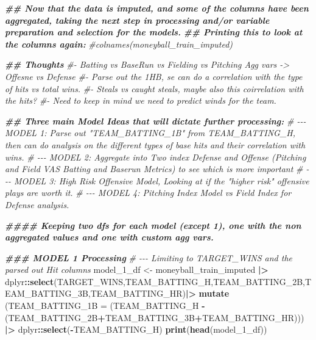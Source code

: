 \documentclass[
]{article}
\newenvironment{Shaded}{\begin{snugshade}}{\end{snugshade}}
\newcommand{\AttributeTok}[1]{\textcolor[rgb]{0.13,0.29,0.53}{#1}}
\newcommand{\CommentTok}[1]{\textcolor[rgb]{0.56,0.35,0.01}{\textit{#1}}}
\newcommand{\DocumentationTok}[1]{\textcolor[rgb]{0.56,0.35,0.01}{\textbf{\textit{#1}}}}
\newcommand{\FunctionTok}[1]{\textcolor[rgb]{0.13,0.29,0.53}{\textbf{#1}}}
\newcommand{\NormalTok}[1]{#1}
\newcommand{\OtherTok}[1]{\textcolor[rgb]{0.56,0.35,0.01}{#1}}
\newcommand{\SpecialCharTok}[1]{\textcolor[rgb]{0.81,0.36,0.00}{\textbf{#1}}}
\begin{document}
\begin{Shaded}
\begin{Highlighting}[]
\DocumentationTok{\#\# Now that the data is imputed, and some of the columns have been aggregated, taking the next step in processing and/or variable preparation and selection for the models. }
\DocumentationTok{\#\# Printing this to look at the columns again: }
\CommentTok{\#colnames(moneyball\_train\_imputed)}

\DocumentationTok{\#\# Thoughts}
\CommentTok{\#{-} Batting vs BaseRun vs Fielding vs Pitching Agg vars {-}\textgreater{} Offesne vs Defense }
\CommentTok{\#{-} Parse out the 1HB, se can do a correlation with the type of hits vs total wins. }
\CommentTok{\#{-} Steals vs caught steals, maybe also this coirrelation with the hits? }
\CommentTok{\#{-} Need to keep in mind we need to predict winds for the team.}


\DocumentationTok{\#\# Three main Model Ideas that will dictate further processing: }
\CommentTok{\# {-}{-}{-} MODEL 1: Parse out "TEAM\_BATTING\_1B" from TEAM\_BATTING\_H, then can do analysis on the different types of base hits and their correlation with wins. }
\CommentTok{\# {-}{-}{-} MODEL 2: Aggregate into Two index Defense and Offense (Pitching and Field VAS Batting and Baserun Metrics) to see which is more important }
\CommentTok{\# {-}{-}{-} MODEL 3: High Risk Offensive Model, Looking at if the "higher risk" offensive plays are worth it. }
\CommentTok{\# {-}{-}{-} MODEL 4: Pitching Index Model vs Field Index for Defense analysis. }

\DocumentationTok{\#\#\#\# Keeping two dfs for each model (except 1), one with the non aggregated values and one with custom agg vars.}

\DocumentationTok{\#\#\# MODEL 1 Processing }
\CommentTok{\# {-}{-}{-} Limiting to TARGET\_WINS and the parsed out Hit columns}
\NormalTok{model\_1\_df }\OtherTok{\textless{}{-}}\NormalTok{ moneyball\_train\_imputed }\SpecialCharTok{|\textgreater{}} 
\NormalTok{  dplyr}\SpecialCharTok{::}\FunctionTok{select}\NormalTok{(TARGET\_WINS,TEAM\_BATTING\_H,TEAM\_BATTING\_2B,TEAM\_BATTING\_3B,TEAM\_BATTING\_HR)}\SpecialCharTok{|\textgreater{}}
  \FunctionTok{mutate}\NormalTok{ (}\AttributeTok{TEAM\_BATTING\_1B =}\NormalTok{ (TEAM\_BATTING\_H }\SpecialCharTok{{-}}\NormalTok{ (TEAM\_BATTING\_2B}\SpecialCharTok{+}\NormalTok{TEAM\_BATTING\_3B}\SpecialCharTok{+}\NormalTok{TEAM\_BATTING\_HR))) }\SpecialCharTok{|\textgreater{}}
\NormalTok{  dplyr}\SpecialCharTok{::}\FunctionTok{select}\NormalTok{(}\SpecialCharTok{{-}}\NormalTok{TEAM\_BATTING\_H)}
\FunctionTok{print}\NormalTok{(}\FunctionTok{head}\NormalTok{(model\_1\_df))}
\end{Highlighting}
\end{Shaded}
\end{document}
